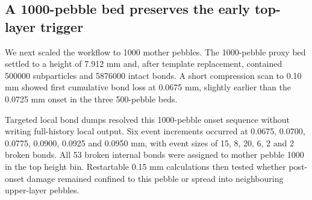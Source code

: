 \documentclass[10pt,twocolumn]{article}
\begin{document}
\subsection{A 1000-pebble bed preserves the early top-layer trigger}

We next scaled the workflow to 1000 mother pebbles. The 1000-pebble proxy bed settled to a height of 7.912 mm and, after template replacement, contained 500000 subparticles and 5876000 intact bonds. A short compression scan to 0.10 mm showed first cumulative bond loss at 0.0675 mm, slightly earlier than the 0.0725 mm onset in the three 500-pebble beds.


Targeted local bond dumps resolved this 1000-pebble onset sequence without writing full-history local output. Six event increments occurred at 0.0675, 0.0700, 0.0775, 0.0900, 0.0925 and 0.0950 mm, with event sizes of 15, 8, 20, 6, 2 and 2 broken bonds. All 53 broken internal bonds were assigned to mother pebble 1000 in the top height bin. Restartable 0.15 mm calculations then tested whether post-onset damage remained confined to this pebble or spread into neighbouring upper-layer pebbles.


\begin{table}[!t]
\centering
\caption{Summary of 500- and 1000-pebble event-sequence cases.}
\label{tab:event-summary}
\footnotesize
{}
\end{table}
\end{document}
